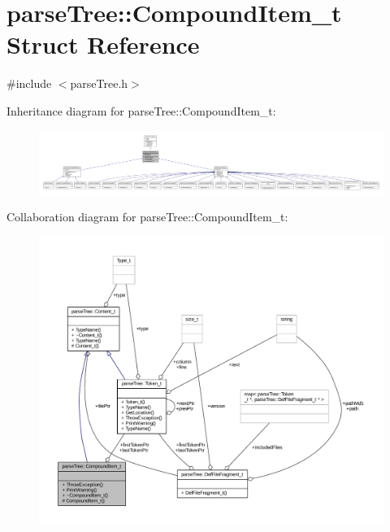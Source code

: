 \hypertarget{structparse_tree_1_1_compound_item__t}{}\section{parse\+Tree\+:\+:Compound\+Item\+\_\+t Struct Reference}
\label{structparse_tree_1_1_compound_item__t}


{\ttfamily \#include $<$parse\+Tree.\+h$>$}



Inheritance diagram for parse\+Tree\+:\+:Compound\+Item\+\_\+t\+:
\nopagebreak
\begin{figure}[H]
\begin{center}
\leavevmode
\includegraphics[width=350pt]{structparse_tree_1_1_compound_item__t__inherit__graph}
\end{center}
\end{figure}


Collaboration diagram for parse\+Tree\+:\+:Compound\+Item\+\_\+t\+:
\nopagebreak
\begin{figure}[H]
\begin{center}
\leavevmode
\includegraphics[width=350pt]{structparse_tree_1_1_compound_item__t__coll__graph}
\end{center}
\end{figure}

